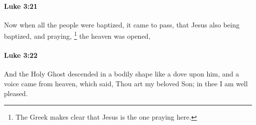 		\paragraph{Luke 3:21} %
			\label{LUKE-3-21}

			Now when all the people were baptized, it came to pass, that Jesus also being baptized, and praying,%
				\footnote{%
					The Greek makes clear that Jesus is the one praying here.
					}
			the heaven was opened,

			\begin{framed}
			\scriptsize
				\begin{compactdesc}
					\item[SBLG] 
				\end{compactdesc}
			\end{framed}

		\paragraph{Luke 3:22} %
			\label{LUKE-3-22}

			And the Holy Ghost descended in a bodily shape like a dove upon him, and a voice came from heaven, which said, Thou art my beloved Son; in thee I am well pleased.

